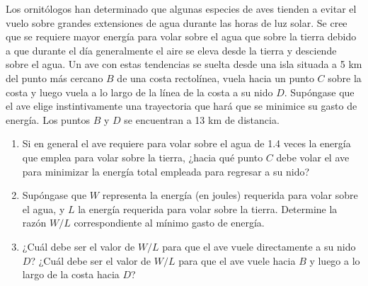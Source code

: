 \item Los ornitólogos han determinado que algunas especies de aves tienden a evitar el vuelo sobre grandes extensiones de agua durante las horas de luz solar. Se cree que se requiere mayor energía para volar sobre el agua que sobre la tierra debido a que durante el día generalmente el aire se eleva desde la tierra y desciende sobre el agua. Un ave con estas tendencias se suelta desde una isla situada a 5 km del punto más cercano $B$ de una costa rectolínea, vuela hacia un punto $C$ sobre la costa y luego vuela a lo largo de la línea de la costa a su nido $D$. Supóngase que el ave elige instintivamente una trayectoria que hará que se minimice su gasto de energía. Los puntos $B$ y $D$ se encuentran a 13 km de distancia.
\begin{enumerate}
    \item[(a)] Si en general el ave requiere para volar sobre el agua de 1.4 veces la energía que emplea para volar sobre la tierra, ¿hacia qué punto $C$ debe volar el ave para minimizar la energía total empleada para regresar a su nido?
    \item[(b)] Supóngase que $W$ representa la energía (en joules) requerida para volar sobre el agua, y $L$ la energía requerida para volar sobre la tierra. Determine la razón $W/L$ correspondiente al mínimo gasto de energía.
    \item[(c)] ¿Cuál debe ser el valor de $W/L$ para que el ave vuele directamente a su nido $D$? ¿Cuál debe ser el valor de $W/L$ para que el ave vuele hacia $B$ y luego a lo largo de la costa hacia $D$?
\end{enumerate}
\begin{center}
\end{center}
